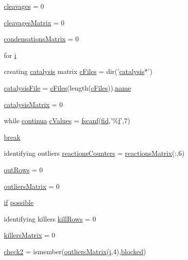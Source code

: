 \begin{DoxyCompactItemize}
\item 
\hyperlink{a00029_a89060c6979e5a4ff7b0985b35f295695}{cleavages} = 0
\item 
\hyperlink{a00029_a1a691fb4f955887edfa538e91479fafe}{cleavages\-Matrix} = 0
\item 
\hyperlink{a00029_afaba8eef2f8f4e4dda2e893a19e55a94}{condensations\-Matrix} = 0
\item 
for \hyperlink{a00029_ac870e1cd47f6d78f16a98a24c8392fcf}{i}
\item 
creating \hyperlink{a00012}{catalysis} matrix \hyperlink{a00029_a9eab57ccb42a39c704f47dc30e4f4515}{c\-Files} = dir('\hyperlink{a00012}{catalysis}$\ast$')
\item 
\hyperlink{a00029_a33e70cf5b45cb59005b82d30202f0b69}{catalysis\-File} = \hyperlink{a00030_a9eab57ccb42a39c704f47dc30e4f4515}{c\-Files}(length(\hyperlink{a00030_a9eab57ccb42a39c704f47dc30e4f4515}{c\-Files})).\hyperlink{a00027_abbf559a76fab59203496b0847ab9502a}{name}
\item 
\hyperlink{a00029_a0810027f58d6be965e44b7b84c44ace8}{catalysis\-Matrix} = 0
\item 
while \hyperlink{a00030_a9c951ebd5bc3f1adce943bee1255f4d6}{continua} \hyperlink{a00029_ad4ba7701967c1da20171228afccb7081}{c\-Values} = \hyperlink{a00025_a028ac102a731e62fb0a7439381f566c1}{fscanf}(\hyperlink{a00031_ae9011d40c6f13e68e6f07156e0da7c5d}{fid},'\%\hyperlink{a00025_a9c5a71c46b1abb8b7df5ebeac6c81535}{f}',7)
\item 
\hyperlink{a00029_a91cf6fbebedd86150a36e5ac3d5d3bfc}{break}
\item 
identifying outliers \hyperlink{a00029_aeea253cb98a56047ef20ceed86e2f0ea}{reactions\-Counters} = \hyperlink{a00030_af998036b749d9fa6dd2365f9937279b6}{reactions\-Matrix}(\-:,6)
\item 
\hyperlink{a00029_a60cfb1ca20cbbc81b85a8f56658b7c99}{out\-Rows} = 0
\item 
\hyperlink{a00029_ad8a18b407726bf44299c9bcf5d1389ff}{outliers\-Matrix} = 0
\item 
\hyperlink{a00030_a01d55766b8058903dd360b4bda71f9f5}{if} \hyperlink{a00029_a07c9e68cdbafe572c04d3112d64deb88}{possible}
\item 
identifying killers \hyperlink{a00029_a747bc1d10158c78e88e314825ed41a13}{kill\-Rows} = 0
\item 
\hyperlink{a00029_a929016802e1ede2217a41240a6974fa6}{killers\-Matrix} = 0
\item 
\hyperlink{a00029_a98a8838a85ed24032563a44271b1525a}{check2} = ismember(\hyperlink{a00030_a9733b61dd859b1133aa3aa849cf70cbc}{outliers\-Matrix}(\hyperlink{a00113_ad3efca1ea6e3333daf30719ee0501862}{i},4),\hyperlink{a00030_a1faaaae288fc8ca4ed1751049aa2f84f}{blocked})

\end{DoxyCompactItemize}
